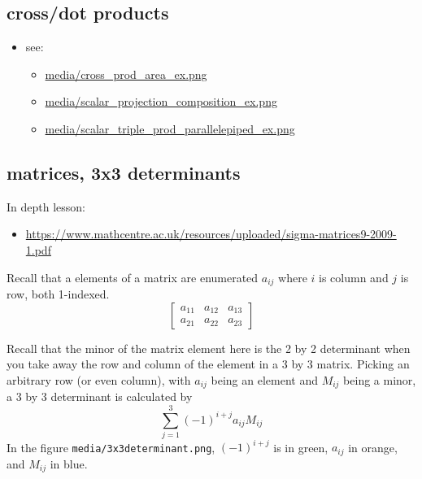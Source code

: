 \documentclass[11pt]{article}
\theoremstyle{definition}
\begin{document}
\subsection*{cross/dot products}
\begin{itemize}
  \item see:
  \begin{itemize}
    \item \url{media/cross_prod_area_ex.png}
    \item \url{media/scalar_projection_composition_ex.png}
    \item \url{media/scalar_triple_prod_parallelepiped_ex.png}
  \end{itemize}
\end{itemize}
\subsection*{matrices, 3x3 determinants}
In depth lesson:
\begin{itemize}
  \item \url{https://www.mathcentre.ac.uk/resources/uploaded/sigma-matrices9-2009-1.pdf}
\end{itemize}

Recall that a elements of a matrix are enumerated $a_{ij}$ where $i$ is column and $j$ is row, both 1-indexed. 
\[\begin{bmatrix}
  a_{11} & a_{12} & a_{13}\\
  a_{21} & a_{22} & a_{23}
\end{bmatrix}\]

Recall that the minor of the matrix element here is the 2 by 2 determinant when you take away the row and column of the element in a 3 by 3 matrix.  Picking an arbitrary row (or even column), with $a_{ij}$ being an element and $M_{ij}$ being a minor, a 3 by 3 determinant is calculated by 
\[ \sum_{j=1}^{3} (-1)^{i+j} a_{ij} M_{ij} \]
In the figure \texttt{media/3x3determinant.png}, $(-1)^{i+j}$ is in green, $a_{ij}$ in orange, and $M_{ij}$ in blue.






\end{document}
